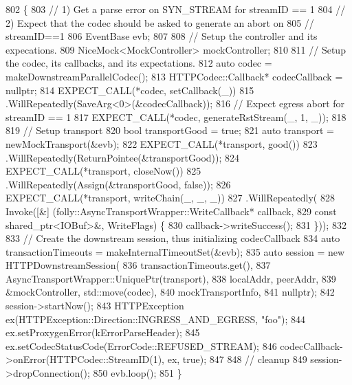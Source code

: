 \begin{DoxyCode}
802                                           \{
803   \textcolor{comment}{// 1) Get a parse error on SYN\_STREAM for streamID == 1}
804   \textcolor{comment}{// 2) Expect that the codec should be asked to generate an abort on}
805   \textcolor{comment}{//    streamID==1}
806   EventBase evb;
807 
808   \textcolor{comment}{// Setup the controller and its expecations.}
809   NiceMock<MockController> mockController;
810 
811   \textcolor{comment}{// Setup the codec, its callbacks, and its expectations.}
812   \textcolor{keyword}{auto} codec = makeDownstreamParallelCodec();
813   HTTPCodec::Callback* codecCallback = \textcolor{keyword}{nullptr};
814   EXPECT\_CALL(*codec, setCallback(\_))
815     .WillRepeatedly(SaveArg<0>(&codecCallback));
816   \textcolor{comment}{// Expect egress abort for streamID == 1}
817   EXPECT\_CALL(*codec, generateRstStream(\_, 1, \_));
818 
819   \textcolor{comment}{// Setup transport}
820   \textcolor{keywordtype}{bool} transportGood = \textcolor{keyword}{true};
821   \textcolor{keyword}{auto} transport = newMockTransport(&evb);
822   EXPECT\_CALL(*transport, good())
823     .WillRepeatedly(ReturnPointee(&transportGood));
824   EXPECT\_CALL(*transport, closeNow())
825     .WillRepeatedly(Assign(&transportGood, \textcolor{keyword}{false}));
826   EXPECT\_CALL(*transport, writeChain(\_, \_, \_))
827     .WillRepeatedly(
828       Invoke([&] (folly::AsyncTransportWrapper::WriteCallback* callback,
829                   \textcolor{keyword}{const} shared\_ptr<IOBuf>&, WriteFlags) \{
830                callback->writeSuccess();
831              \}));
832 
833   \textcolor{comment}{// Create the downstream session, thus initializing codecCallback}
834   \textcolor{keyword}{auto} transactionTimeouts = makeInternalTimeoutSet(&evb);
835   \textcolor{keyword}{auto} session = \textcolor{keyword}{new} HTTPDownstreamSession(
836     transactionTimeouts.get(),
837     AsyncTransportWrapper::UniquePtr(transport),
838     localAddr, peerAddr,
839     &mockController, std::move(codec),
840     mockTransportInfo,
841     \textcolor{keyword}{nullptr});
842   session->startNow();
843   HTTPException ex(HTTPException::Direction::INGRESS\_AND\_EGRESS, \textcolor{stringliteral}{"foo"});
844   ex.setProxygenError(kErrorParseHeader);
845   ex.setCodecStatusCode(ErrorCode::REFUSED\_STREAM);
846   codecCallback->onError(HTTPCodec::StreamID(1), ex, \textcolor{keyword}{true});
847 
848   \textcolor{comment}{// cleanup}
849   session->dropConnection();
850   evb.loop();
851 \}
\end{DoxyCode}
